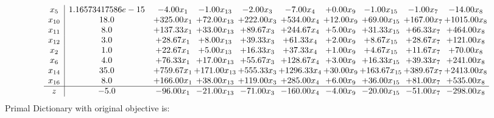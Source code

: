 \documentclass[9pt]{article}
\begin{document}
\[\begin{array}{c| c c@{\hskip 2pt} c@{\hskip 2pt} c@{\hskip 2pt} c@{\hskip 2pt} c@{\hskip 2pt} c@{\hskip 2pt} c@{\hskip 2pt} c@{\hskip 2pt} }
 x_{5}   &  1.16573417586e-15 & -4.00 x_{1} & -1.00 x_{13} & -2.00 x_{3} & -7.00 x_{4} & +  0.00 x_{9} & -1.00 x_{15} & -1.00 x_{7} & -14.00 x_{8}\\
 x_{10}   &  18.0 & + 325.00 x_{1} & + 72.00 x_{13} & + 222.00 x_{3} & + 534.00 x_{4} & + 12.00 x_{9} & + 69.00 x_{15} & + 167.00 x_{7} & + 1015.00 x_{8}\\
 x_{11}   &  8.0 & + 137.33 x_{1} & + 33.00 x_{13} & + 89.67 x_{3} & + 244.67 x_{4} & +  5.00 x_{9} & + 31.33 x_{15} & + 66.33 x_{7} & + 464.00 x_{8}\\
 x_{12}   &  3.0 & + 28.67 x_{1} & +  8.00 x_{13} & + 39.33 x_{3} & + 61.33 x_{4} & +  2.00 x_{9} & +  8.67 x_{15} & + 28.67 x_{7} & + 121.00 x_{8}\\
 x_{2}   &  1.0 & + 22.67 x_{1} & +  5.00 x_{13} & + 16.33 x_{3} & + 37.33 x_{4} & +  1.00 x_{9} & +  4.67 x_{15} & + 11.67 x_{7} & + 70.00 x_{8}\\
 x_{6}   &  4.0 & + 76.33 x_{1} & + 17.00 x_{13} & + 55.67 x_{3} & + 128.67 x_{4} & +  3.00 x_{9} & + 16.33 x_{15} & + 39.33 x_{7} & + 241.00 x_{8}\\
 x_{14}   &  35.0 & + 759.67 x_{1} & + 171.00 x_{13} & + 555.33 x_{3} & + 1296.33 x_{4} & + 30.00 x_{9} & + 163.67 x_{15} & + 389.67 x_{7} & + 2413.00 x_{8}\\
 x_{16}   &  8.0 & + 166.00 x_{1} & + 38.00 x_{13} & + 119.00 x_{3} & + 285.00 x_{4} & +  6.00 x_{9} & + 36.00 x_{15} & + 81.00 x_{7} & + 535.00 x_{8}\\
\hline
z    &  -5.0 & -96.00 x_{1} & -21.00 x_{13} & -71.00 x_{3} & -160.00 x_{4} & -4.00 x_{9} & -20.00 x_{15} & -51.00 x_{7} & -298.00 x_{8}\\
\end{array}\]
Primal Dictionary with original objective is:
\end{document}
